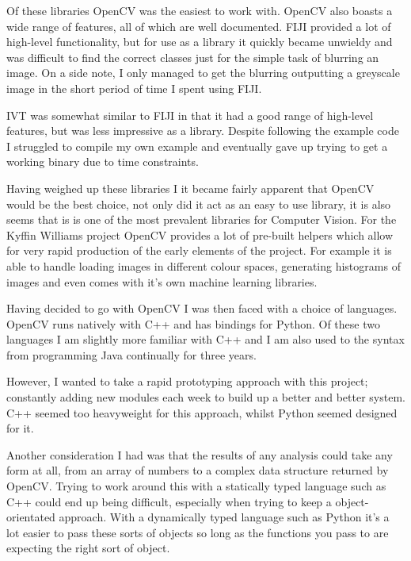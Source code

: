 \documentclass[11pt,fleqn,twoside]{article}
\begin{document}
Of these libraries OpenCV was the easiest to work with. OpenCV also boasts a wide range of 
features, all of which are well documented. FIJI provided a lot of high-level functionality, but
for use as a library it quickly became unwieldy and was difficult to find the correct classes just 
for the simple task of blurring an image. On a side note, I only managed to get the blurring 
outputting a greyscale image in the short period of time I spent using FIJI.

IVT was somewhat similar to FIJI in that it had a good range of high-level features, but was less
impressive as a library. Despite following the example code I struggled to compile my own example
and eventually gave up trying to get a working binary due to time constraints.


Having weighed up these libraries I it became fairly apparent that OpenCV would be the best choice,
not only did it act as an easy to use library, it is also seems that is is one of the most 
prevalent libraries for Computer Vision. For the Kyffin Williams project OpenCV provides a lot of
pre-built helpers which allow for very rapid production of the early elements of the project. For
example it is able to handle loading images in different colour spaces, generating histograms of
images and even comes with it's own machine learning libraries.

Having decided to go with OpenCV I was then faced with a choice of languages. OpenCV runs natively
with C++ and has bindings for Python. Of these two languages I am slightly more familiar with C++ 
and I am also used to the syntax from programming Java continually for three years. 

However, I wanted to take a rapid prototyping approach with this project; constantly adding new 
modules each week to build up a better and better system. C++ seemed too heavyweight for this 
approach, whilst Python seemed designed for it.

Another consideration I had was that the results of any analysis could take any form at all, from
an array of numbers to a complex data structure returned by OpenCV. Trying to work around this with
a statically typed language such as C++ could end up being difficult, especially when trying to 
keep a object-orientated approach. With a dynamically typed language such as Python it's a lot 
easier to pass these sorts of objects so long as the functions you pass to are expecting the right 
sort of object.
\end{document}
